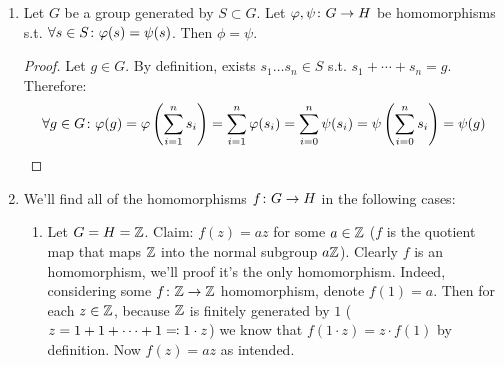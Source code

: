 \documentclass[a4paper]{article}
\newcommand \envendproof{\vspace{-17pt}}
\begin{document}
\begin{enumerate}
\begin{proof}
		\end{proof}
		\item Let $G$ be a group generated by $S \subset G$. Let $\varphi, \psi \colon G \to H$ be homomorphisms s.t. $\forall s \in S \colon \varphi(s) = \psi(s)$. Then $\phi = \psi$. \begin{proof}
			Let $g \in G$. By definition, exists $s_1 \dots s_n \in S$ s.t. $s_1 + \cdots + s_n = g$. Therefore: 
			\[ \forall g \in G \colon \varphi(g) = \varphi\left ( \sum_{i = 1}^{n}s_i \right ) = \sum_{i = 1}^{n}\varphi(s_i) = \sum_{i = 0}^{n} \psi(s_i) = \psi\left ( \sum_{i = 0}^{n} s_i \right ) = \psi(g) \]\envendproof
		\end{proof}
		\item We'll find all of the homomorphisms $f \colon G \to H$ in the following cases: 
		\begin{enumerate}
			\item Let $G = H = \mathbb{Z}$. Claim: $f(z) = az$ for some $a \in \mathbb{Z}$ ($f$ is the quotient map that maps $\mathbb{Z}$ into the normal subgroup $a\mathbb{Z}$). Clearly $f$ is an homomorphism, we'll proof it's the only homomorphism. Indeed, considering some $f \colon \mathbb{Z} \to \mathbb{Z}$ homomorphism, denote $f(1) = a$. Then for each $z \in \mathbb{Z}$, because $\mathbb{Z}$ is finitely generated by $1$ ($z = 1 + 1 + \cdots + 1 \eqqcolon 1 \cdot z$) we know that $f(1 \cdot z) = z \cdot f(1)$ by definition. Now $f(z) = az$ as intended. 
			

\end{enumerate}
\end{enumerate}
\end{document}
